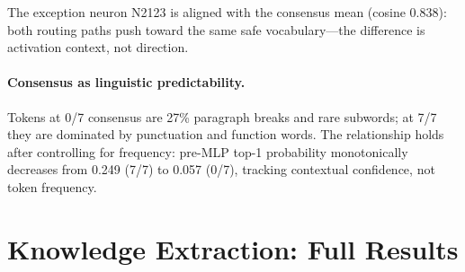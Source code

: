 \documentclass{article}
\begin{document}
The exception neuron N2123 is aligned with the consensus mean (cosine 0.838):
both routing paths push toward the same safe vocabulary---the difference is
activation context, not direction.

\paragraph{Consensus as linguistic predictability.}
Tokens at 0/7 consensus are 27\% paragraph breaks and rare subwords;
at 7/7 they are dominated by punctuation and function words.
The relationship holds after controlling for frequency: pre-MLP top-1
probability monotonically decreases from 0.249 (7/7) to 0.057 (0/7),
tracking contextual confidence, not token frequency.

\section{Knowledge Extraction: Full Results}
\label{app:knowledge}
\end{document}
